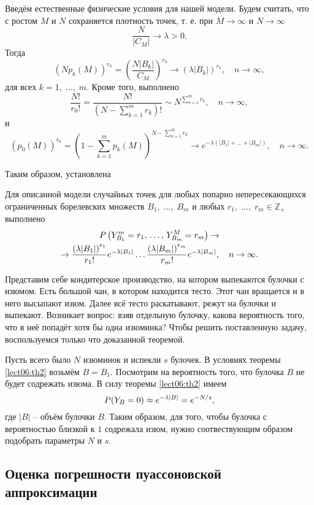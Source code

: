 Введём естественные физические условия для нашей модели. Будем считать, что с ростом $M$ и $N$ сохраняется плотность точек, т. е.  при $M\to\infty$ и $N\to\infty$
\[ \dfrac{N}{|C_M|}\to\lambda>0. \]
Тогда
\[ \left(Np_k(M)\right)^{r_k}=\left(\dfrac{N|B_k|}{C_M}\right)^{r_k}\to\left(\lambda|B_k|\right)^{r_k},\quad n\to\infty, \]
для всех $k=1,\;\ldots,\;m$. Кроме того, выполнено
\[ \dfrac{N!}{r_0!}=\dfrac{N!}{\left(N-\displaystyle{\sum_{k=1}^mr_k}\right)!}\sim N^{\displaystyle{\sum_{k=1}^mr_k}},\quad n\to\infty,  \]
и
\[ \left(p_0(M)\right)^{r_0}=\left(1-\sum_{k=1}^mp_k(M)\right)^{N-\displaystyle{\sum_{k=1}^mr_k}}\to e^{-\lambda\left(|B_1|+\ldots+|B_m|\right)},\quad n\to\infty. \]

Таким образом, установлена

\begin{theorem}\label{lect06:th2}
Для описанной модели случайных точек для любых попарно непересекающихся ограниченных борелевских множеств $B_1,\;\ldots,\;B_m$ и любых $r_1,\;\ldots,\;r_m\in\mathbb{Z}_+$ выполнено
\begin{multline*}
\P\left(Y_{B_1}^m=r_1,\,\ldots,\,Y_{B_m}^M=r_m\right)\to\\
\to\dfrac{\left(\lambda|B_1|\right)^{r_1}}{r_1!}e^{-\lambda|B_1|}\ldots\dfrac{\left(\lambda|B_m|\right)^{r_m}}{r_m!}e^{-\lambda|B_m|},\quad n\to\infty.
\end{multline*}
\end{theorem}

\begin{example}\label{lect06:ex3}
Представим себе кондитерское производство, на котором выпекаются булочки с изюмом. Есть большой чан, в котором находится тесто. Этот чан вращается и в него высыпают изюм. Далее всё тесто раскатывают, режут на булочки и выпекают. Возникает вопрос: взяв отдельную булочку, какова вероятность того, что в неё попадёт хотя бы одна изюминка? Чтобы решить поставленную задачу, воспользуемся только что доказанной теоремой. 

Пусть всего было $N$ изюминок и испекли $s$ булочек. В условиях теоремы \ref{lect06:th2} возьмём $B=B_1$. Посмотрим на вероятность того, что булочка $B$ не будет содрежать изюма. В силу теоремы \ref{lect06:th2} имеем
\[ \P(Y_B=0)\approx e^{-\lambda|B|}=e^{-N/s}, \]
где $|B|$ -- объём булочки $B$. Таким образом, для того, чтобы булочка с вероятностью близкой к $1$ содрежала изюм, нужно соотвествующим образом подобрать параметры $N$ и $s$.
\end{example}

\subsection{Оценка погрешности пуассоновской аппроксимации}

